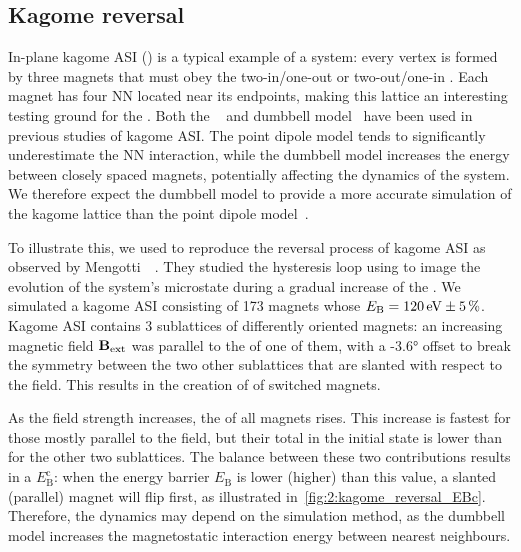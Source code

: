\subsection{Kagome reversal}
In-plane kagome ASI () is a typical example of a  system: every vertex is formed by three magnets that must obey the two-in/one-out or two-out/one-in .
Each magnet has four NN located near its endpoints, making this lattice an interesting testing ground for the .
Both the ~\cite{Chern2011} and dumbbell model~\cite{Moller2009} have been used in previous studies of kagome ASI.
The point dipole model tends to significantly underestimate the NN interaction, while the dumbbell model increases the  energy between closely spaced magnets, potentially affecting the dynamics of the system.
We therefore expect the dumbbell model to provide a more accurate simulation of the kagome lattice than the point dipole model~\cite{flatspin,mengotti2011kagome}. \par
To illustrate this, we used \hotspice to reproduce the reversal process of kagome ASI as observed by Mengotti~\etal~\cite{mengotti2011kagome}.
They studied the hysteresis loop using  to image the evolution of the system's microstate during a gradual increase of the .
We simulated a kagome ASI consisting of 173 magnets whose  $E_\mathrm{B} = \SI{120}{\electronvolt} \pm \SI{5}{\percent}$.
Kagome ASI contains 3 sublattices of differently oriented magnets: an increasing magnetic field $\boldsymbol{\mathbf{B}}_\mathrm{ext}$ was parallel to the  of one of them, with a \ang{-3.6} offset to break the symmetry between the two other sublattices that are slanted with respect to the field.
This results in the creation of  of switched magnets. \par
As the field strength increases, the  of all magnets rises.
This increase is fastest for those mostly parallel to the field, but their total  in the initial state is lower than for the other two sublattices.
The balance between these two contributions results in a  $E_\mathrm{B}^\mathrm{c}$: when the energy barrier $E_\mathrm{B}$ is lower (higher) than this value, a slanted (parallel) magnet will flip first, as illustrated in~\cref{fig:2:kagome_reversal_EBc}.
Therefore, the dynamics may depend on the simulation method, as the dumbbell model increases the magnetostatic interaction energy between nearest neighbours. \par

